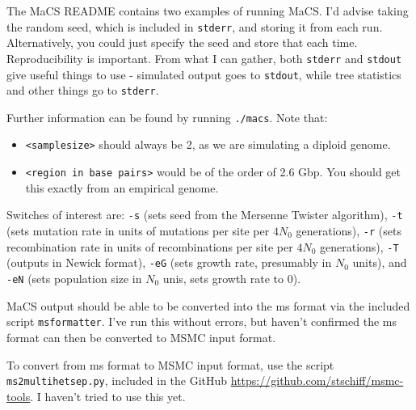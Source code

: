 \documentclass[11pt,a4paper]{article}
\begin{document}
The MaCS README contains two examples of running MaCS. I'd advise taking the random seed, which is included in \texttt{stderr}, and storing it from each run. Alternatively, you could just specify the seed and store that each time. Reproducibility is important. From what I can gather, both \texttt{stderr} and \texttt{stdout} give useful things to use - simulated output goes to \texttt{stdout}, while tree statistics and other things go to \texttt{stderr}.

Further information can be found by running \texttt{./macs}. Note that:
\begin{itemize}
\item \texttt{<samplesize>} should always be 2, as we are simulating a diploid genome.
\item \texttt{<region in base pairs>} would be of the order of 2.6 Gbp. You should get this exactly from an empirical genome.
\end{itemize}
Switches of interest are: \texttt{-s} (sets seed from the Mersenne Twister algorithm), \texttt{-t} (sets mutation rate in units of mutations per site per $4N_0$ generations), \texttt{-r} (sets recombination rate in units of recombinations per site per $4N_0$ generations), \texttt{-T} (outputs in Newick format), \texttt{-eG} (sets growth rate, presumably in $N_0$ units), and \texttt{-eN} (sets population size in $N_0$ unis, sets growth rate to 0).

MaCS output should be able to be converted into the ms format via the included script \texttt{msformatter}. I've run this without errors, but haven't confirmed the ms format can then be converted to MSMC input format.

To convert from ms format to MSMC input format, use the script \texttt{ms2multihetsep.py}, included in the GitHub \url{https://github.com/stschiff/msmc-tools}. I haven't tried to use this yet.
\end{document}
